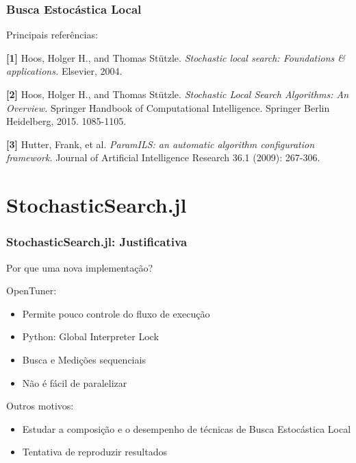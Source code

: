 \documentclass[10pt, compress]{beamer}
\begin{document}
\begin{frame}[fragile]
    \frametitle{Busca Estocástica Local}
    Principais referências:

    \textbf{[1]} Hoos, Holger H., and Thomas Stützle.
    \emph{Stochastic local search: Foundations \& applications.} Elsevier, 2004.
            \pause

    \textbf{[2]} Hoos, Holger H., and Thomas Stützle. \emph{Stochastic Local Search Algorithms: An Overview.}
    Springer Handbook of Computational Intelligence. Springer Berlin Heidelberg, 2015. 1085-1105.
            \pause

    \textbf{[3]} Hutter, Frank, et al. \emph{ParamILS: an automatic
    algorithm configuration framework.} Journal of Artificial
    Intelligence Research 36.1 (2009): 267-306.
\end{frame}

\section{StochasticSearch.jl}

\begin{frame}[fragile]
    \frametitle{StochasticSearch.jl: Justificativa}
    Por que uma nova implementação?

    OpenTuner:
    \begin{itemize}
        \item Permite \alert{pouco controle} do fluxo de execução
        \item Python: \alert{Global Interpreter Lock}
        \item Busca e Medições \alert{sequenciais}
        \item Não é fácil de \alert{paralelizar}
    \end{itemize}
    \pause
    Outros motivos:
    \begin{itemize}
        \item Estudar a \alert{composição} e o \alert{desempenho} de técnicas
            de Busca Estocástica Local
            \pause
        \item Tentativa de \alert{reproduzir} resultados
    \end{itemize}
\end{frame}
\end{document}
